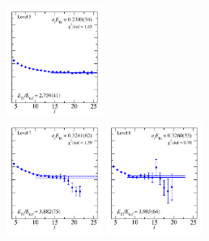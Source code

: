 \begin{figure}
  \includegraphics[width=0.28\textwidth]{figures/spectrum_a1gm/no_tq/fits/fit_5.pdf}\\
  \includegraphics[width=0.28\textwidth]{figures/spectrum_a1gm/no_tq/fits/fit_8.pdf}
  \includegraphics[width=0.28\textwidth]{figures/spectrum_a1gm/no_tq/fits/fit_6.pdf}\\

\end{figure}
